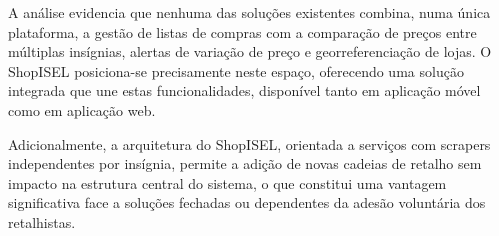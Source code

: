 \begin{table}[H]
\centering
\caption{Comparação entre soluções existentes e o ShopISEL}
\label{tab:comparacao}
\small
\renewcommand{\arraystretch}{1.2}
\end{table}

A análise evidencia que nenhuma das soluções existentes combina, numa única plataforma, a gestão de listas de compras com a comparação de preços entre múltiplas insígnias, alertas de variação de preço e georreferenciação de lojas. O ShopISEL posiciona-se precisamente neste espaço, oferecendo uma solução integrada que une estas funcionalidades, disponível tanto em aplicação móvel como em aplicação web.

Adicionalmente, a arquitetura do ShopISEL, orientada a serviços com scrapers independentes por insígnia, permite a adição de novas cadeias de retalho sem impacto na estrutura central do sistema, o que constitui uma vantagem significativa face a soluções fechadas ou dependentes da adesão voluntária dos retalhistas.


